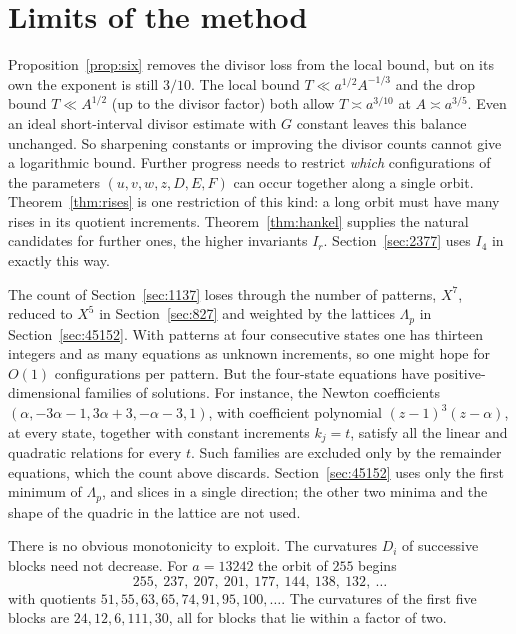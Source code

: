 \documentclass[11pt]{amsart}
\theoremstyle{definition}
\theoremstyle{remark}
\begin{document}
\section{Limits of the method}\label{sec:limits}

Proposition~\ref{prop:six} removes the divisor loss from the local bound, but on its own the
exponent is still $3/10$. The local bound $T\ll a^{1/2}A^{-1/3}$ and the drop bound $T\ll A^{1/2}$ (up to
the divisor factor) both allow $T\asymp a^{3/10}$ at $A\asymp a^{3/5}$. Even an ideal
short-interval divisor estimate with $G$ constant leaves this balance unchanged. So sharpening
constants or improving the divisor counts cannot give a logarithmic bound. Further progress
needs to restrict \emph{which} configurations of the parameters $(u,v,w,z,D,E,F)$ can occur
together along a single orbit. Theorem~\ref{thm:rises} is one restriction of this kind: a long
orbit must have many rises in its quotient increments. Theorem~\ref{thm:hankel} supplies the
natural candidates for further ones, the higher invariants $I_r$. Section~\ref{sec:2377} uses
$I_4$ in exactly this way.

The count of Section~\ref{sec:1137} loses through the number of patterns, $X^7$, reduced to
$X^5$ in Section~\ref{sec:827} and weighted by the lattices $\Lambda_p$ in
Section~\ref{sec:45152}. With patterns at four consecutive states one has thirteen integers and
as many equations as unknown increments, so one might hope for $O(1)$ configurations per
pattern. But the four-state equations have
positive-dimensional families of solutions. For instance, the Newton coefficients
$(\alpha,-3\alpha-1,3\alpha+3,-\alpha-3,1)$, with coefficient polynomial $(z-1)^3(z-\alpha)$, at
every state, together with constant increments $k_j=t$, satisfy all the linear and quadratic
relations for every $t$. Such families are excluded only by the remainder equations, which the
count above discards. Section~\ref{sec:45152} uses only the first minimum of $\Lambda_p$, and slices in a
single direction; the other two minima and the shape of the quadric in the lattice are not used.

There is no obvious monotonicity to exploit. The curvatures $D_i$ of successive blocks need
not decrease. For $a=13242$ the orbit of $255$ begins
\[
255,\ 237,\ 207,\ 201,\ 177,\ 144,\ 138,\ 132,\ \dots
\]
with quotients $51,55,63,65,74,91,95,100,\dots$. The curvatures of the first five blocks are
$24,12,6,111,30$, all for blocks that lie within a factor of two.
\end{document}
